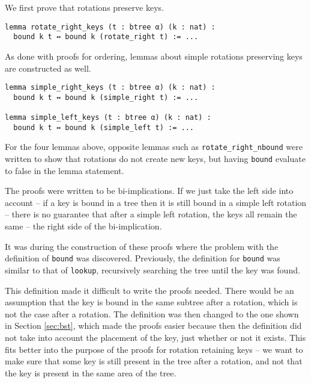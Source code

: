 We first prove that rotations preserve keys.

\begin{lstlisting}
lemma rotate_right_keys (t : btree α) (k : nat) :
  bound k t ↔ bound k (rotate_right t) := ...
\end{lstlisting}

As done with proofs for ordering, lemmas about simple rotations preserving keys are constructed as well.

\begin{lstlisting}
lemma simple_right_keys (t : btree α) (k : nat) :
  bound k t ↔ bound k (simple_right t) := ...
  
lemma simple_left_keys (t : btree α) (k : nat) :
  bound k t ↔ bound k (simple_left t) := ...
\end{lstlisting}

For the four lemmas above, opposite lemmas such as \lstinline{rotate_right_nbound} were written to show that rotations do not create new keys, but having \lstinline{bound} evaluate to false in the lemma statement.

The proofs were written to be bi-implications. If we just take the left side into account -- if a key is bound in a tree then it is still bound in a simple left rotation -- there is no guarantee that after a simple left rotation, the keys all remain the same -- the right side of the bi-implication.  

It was during the construction of these proofs where the problem with the definition of \lstinline{bound} was discovered. Previously, the definition for \lstinline{bound} was similar to that of \lstinline{lookup}, recursively searching the tree until the key was found.

This definition made it difficult to write the proofs needed. There would be an assumption that the key is bound in the same subtree after a rotation, which is not the case after a rotation. The definition was then changed to the one shown in Section \ref{sec:bst}, which made the proofs easier because then the definition did not take into account the placement of the key, just whether or not it exists. This fits better into the purpose of the proofs for rotation retaining keys -- we want to make sure that some key is still present in the tree after a rotation, and not that the key is present in the same area of the tree.